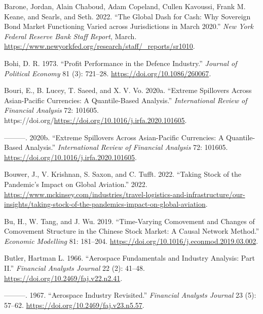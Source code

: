 \documentclass[
  letterpaper,
  DIV=11,
  numbers=noendperiod]{scrartcl}
\newlength{\cslhangindent}
\newlength{\cslentryspacingunit} %
\newenvironment{CSLReferences}[2] %
 {%
  \setlength{\parindent}{0pt}
  \ifodd #1
  \let\oldpar\par
  \def\par{\hangindent=\cslhangindent\oldpar}
  \fi
  \setlength{\parskip}{#2\cslentryspacingunit}
 }%
 {}
\begin{document}
\begin{CSLReferences}{1}{0}
\leavevmode{}%
Barone, Jordan, Alain Chaboud, Adam Copeland, Cullen Kavoussi, Frank M.
Keane, and Searls, and Seth. 2022. {``{The Global Dash for Cash: Why
Sovereign Bond Market Functioning Varied across Jurisdictions in March
2020}.''} \emph{New York Federal Reserve Bank Staff Report}, March.
\url{https://www.newyorkfed.org/research/staff/_reports/sr1010}.

\leavevmode{}%
Bohi, D. R. 1973. {``Profit Performance in the Defence Industry.''}
\emph{Journal of Political Economy} 81 (3): 721--28.
\url{https://doi.org/10.1086/260067}.

\leavevmode{}%
Bouri, E., B. Lucey, T. Saeed, and X. V. Vo. 2020a. {``Extreme
Spillovers Across Asian-Pacific Currencies: A Quantile-Based
Analysis.''} \emph{International Review of Financial Analysis} 72:
101605.
https://doi.org/\url{https://doi.org/10.1016/j.irfa.2020.101605}.

\leavevmode{}%
---------. 2020b. {``Extreme Spillovers Across Asian-Pacific Currencies:
A Quantile-Based Analysis.''} \emph{International Review of Financial
Analysis} 72: 101605. \url{https://doi.org/10.1016/j.irfa.2020.101605}.

\leavevmode{}%
Bouwer, J., V. Krishnan, S. Saxon, and C. Tufft. 2022. {``Taking Stock
of the Pandemic's Impact on Global Aviation.''} 2022.
\url{https://www.mckinsey.com/industries/travel-logistics-and-infrastructure/our-insights/taking-stock-of-the-pandemics-impact-on-global-aviation}.

\leavevmode{}%
Bu, H., W. Tang, and J. Wu. 2019. {``Time-Varying Comovement and Changes
of Comovement Structure in the Chinese Stock Market: A Causal Network
Method.''} \emph{Economic Modelling} 81: 181--204.
\url{https://doi.org/10.1016/j.econmod.2019.03.002}.

\leavevmode{}%
Butler, Hartman L. 1966. {``Aerospace Fundamentals and Industry
Analysis: Part II.''} \emph{Financial Analysts Journal} 22 (2): 41--48.
\url{https://doi.org/10.2469/faj.v22.n2.41}.

\leavevmode{}%
---------. 1967. {``Aerospace Industry Revisited.''} \emph{Financial
Analysts Journal} 23 (5): 57--62.
\url{https://doi.org/10.2469/faj.v23.n5.57}.


\end{CSLReferences}
\end{document}
